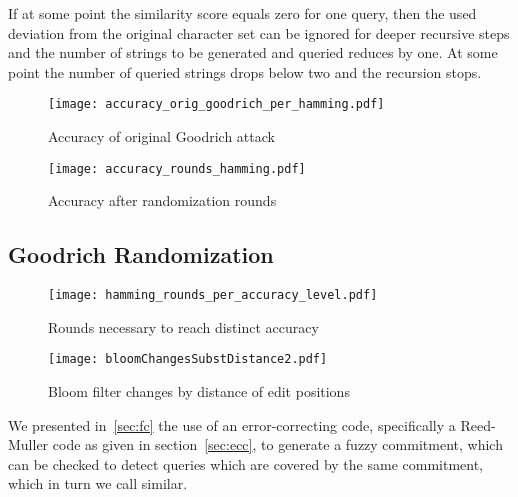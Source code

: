 \documentclass{llncs}
\begin{document}
If at some point the similarity score equals zero for one query, then the used
deviation from the original character set can be ignored for deeper recursive
steps and the number of strings to be generated and queried reduces by one. At
some point the number of queried strings drops below two and the recursion
stops.



\begin{figure*}
        \centering
        \begin{minipage}[b]{0.45\textwidth}
                \centering
                \texttt{[image: accuracy\_orig\_goodrich\_per\_hamming.pdf]}
                \caption{Accuracy of original Goodrich attack}\label{fig:origAttack}
        \end{minipage}\hspace{12pt} \begin{minipage}[b]{0.45\textwidth}
                \centering
                \texttt{[image: accuracy\_rounds\_hamming.pdf]}
                \caption{Accuracy after randomization rounds}
                \label{fig:randAttack}
        \end{minipage}
\end{figure*}

\subsection{Goodrich Randomization}
\label{sec:goodRand}

\begin{figure*}
        \centering
        \begin{minipage}[b]{0.45\textwidth}
                \centering
                \texttt{[image: hamming\_rounds\_per\_accuracy\_level.pdf]}
                \caption{Rounds necessary to reach distinct accuracy}
                \label{fig:accuracyPlateus}
        \end{minipage}\hspace{12pt} \begin{minipage}[b]{0.45\textwidth}
                \centering
                \texttt{[image: bloomChangesSubstDistance2.pdf]}
                \caption{Bloom filter changes by distance of edit positions}
                \label{fig:bloomDistance}
        \end{minipage}
\end{figure*}

We presented in~\ref{sec:fc} the use of an error-correcting code, specifically
a Reed-Muller code as given in section~\ref{sec:ecc}, to generate a fuzzy commitment, which can be
checked to detect queries which are covered by the same commitment, which in
turn we call similar.
\end{document}
